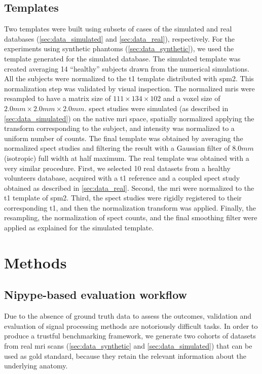\documentclass{frontiers}
\begin{document}
\subsection{Templates} %
\label{sec:data_templates}

Two templates were built using subsets of cases of the simulated and real
  databases (\autoref{sec:data_simulated} and \autoref{sec:data_real}), respectively.
For the experiments using synthetic phantoms (\autoref{sec:data_synthetic}),
  we used the template generated for the simulated database.
The simulated template was created averaging 14 ``healthy'' subjects drawn from
  the numerical simulations.
All the subjects were normalized to the \gls*{t1} template distributed with
  \gls*{spm}2.
This normalization step was validated by visual inspection.
The normalized \glspl*{mri} were resampled to have a matrix size of
  $111\times134\times102$ and a voxel size of $2.0mm\times2.0mm\times2.0mm$.
\Gls*{spect} studies were simulated (as described in \autoref{sec:data_simulated})
  on the native \gls*{mri} space, spatially normalized applying the transform
  corresponding to the subject, and intensity was normalized to a
  uniform number of counts.
The final template was obtained by averaging the normalized \gls*{spect} studies
  and filtering the result with a Gaussian filter of $8.0mm$ (isotropic)
  full width at half maximum.
The real template was obtained with a very similar procedure. 
First, we selected 10 real datasets from a healthy volunteers database, acquired
  with a \gls*{t1} reference and a coupled \gls*{spect} study obtained as
  described in \autoref{sec:data_real}.
Second, the \gls*{mri} were normalized to the \gls*{t1} template of \gls*{spm}2.
Third, the \gls*{spect} studies were rigidly registered to their corresponding \gls*{t1}, 
  and then the normalization transform was applied.
Finally, the resampling, the normalization of \gls*{spect} counts, and the final
  smoothing filter were applied as explained for the simulated template.

\section{Methods}
\label{sec:methods}


\subsection{Nipype-based evaluation workflow}
\label{sec:evaluation}

Due to the absence of ground truth data to assess the outcomes, validation and evaluation 
  of signal processing methods are notoriously difficult tasks.
In order to produce a trustful benchmarking framework, we generate two cohorts
  of datasets from real \gls*{mri} scans (\autoref{sec:data_synthetic}
  and \autoref{sec:data_simulated}) that can be used as gold standard, 
  because they retain the relevant information about the underlying anatomy.
\end{document}
